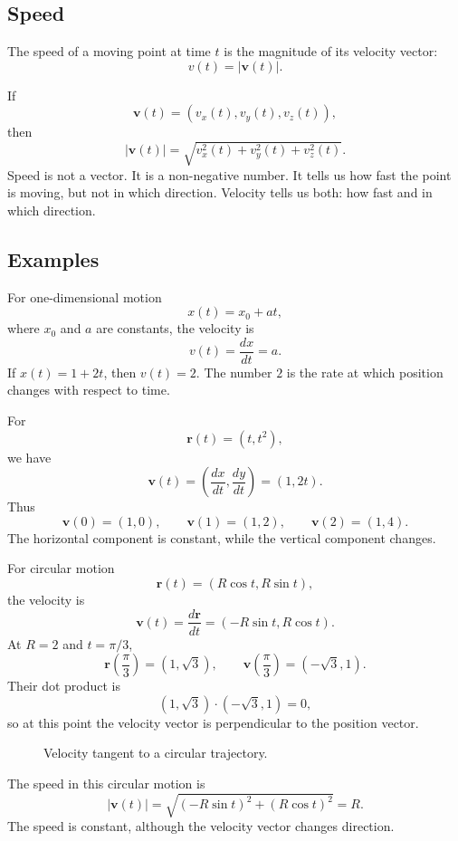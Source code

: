 \subsection{Speed}

\begin{definitionbox}
The speed of a moving point at time \(t\) is the magnitude of its velocity vector:
\[
v(t)=|\mathbf{v}(t)|.
\]
\end{definitionbox}

If
\[
\mathbf{v}(t)=(v_x(t),v_y(t),v_z(t)),
\]
then
\[
|\mathbf{v}(t)|=\sqrt{v_x^2(t)+v_y^2(t)+v_z^2(t)}.
\]
Speed is not a vector. It is a non-negative number. It tells us how fast the point is moving, but not in which direction. Velocity tells us both: how fast and in which direction.

\subsection{Examples}

\begin{examplebox}
For one-dimensional motion
\[
x(t)=x_0+at,
\]
where \(x_0\) and \(a\) are constants, the velocity is
\[
v(t)=\frac{dx}{dt}=a.
\]
If \(x(t)=1+2t\), then \(v(t)=2\). The number \(2\) is the rate at which position changes with respect to time.
\end{examplebox}

\begin{examplebox}
For
\[
\mathbf{r}(t)=(t,t^2),
\]
we have
\[
\mathbf{v}(t)=\left(\frac{dx}{dt},\frac{dy}{dt}\right)=(1,2t).
\]
Thus
\[
\mathbf{v}(0)=(1,0),\qquad \mathbf{v}(1)=(1,2),\qquad \mathbf{v}(2)=(1,4).
\]
The horizontal component is constant, while the vertical component changes.
\end{examplebox}

\begin{examplebox}
For circular motion
\[
\mathbf{r}(t)=(R\cos t,R\sin t),
\]
the velocity is
\[
\mathbf{v}(t)=\frac{d\mathbf{r}}{dt}=(-R\sin t,R\cos t).
\]
At \(R=2\) and \(t=\pi/3\),
\[
\mathbf{r}\left(\frac{\pi}{3}\right)=(1,\sqrt{3}),
\qquad
\mathbf{v}\left(\frac{\pi}{3}\right)=(-\sqrt{3},1).
\]
Their dot product is
\[
(1,\sqrt{3})\cdot(-\sqrt{3},1)=0,
\]
so at this point the velocity vector is perpendicular to the position vector.
\end{examplebox}

\begin{figure}[htbp]
\centering

\caption{Velocity tangent to a circular trajectory.}
\label{fig:kinematics-circular-velocity-tangent}
\end{figure}

The speed in this circular motion is
\[
|\mathbf{v}(t)|=\sqrt{(-R\sin t)^2+(R\cos t)^2}=R.
\]
The speed is constant, although the velocity vector changes direction.
